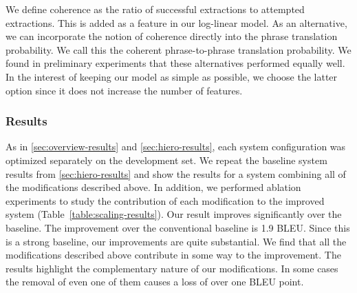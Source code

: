 We define coherence as the ratio of successful extractions 
to attempted extractions.  This is added as a feature in our
log-linear model.  As an alternative, we can incorporate the
notion of coherence directly into the phrase translation
probability.  We call this the coherent phrase-to-phrase
translation probability.  We found in preliminary experiments
that these alternatives performed equally well.  In the 
interest of keeping our model as simple as possible, we choose
the latter option since it does not increase the number of 
features.

\subsubsection{Results}\label{sec:scaling-results}

\figpreamble
\begin{table}
	\figpostamble
	\caption{Results of scaling modifications and ablation experiments.}
	\label{table:scaling-results}
\end{table}

As in \textsection\ref{sec:overview-results} and 
\textsection\ref{sec:hiero-results}, each system configuration
was optimized separately on the development set.
We repeat the baseline system results from \textsection\ref{sec:hiero-results}
and show the results for a system combining all of the modifications
described above.  In addition, we performed ablation experiments
to study the contribution of each modification to the improved
system (Table~\ref{table:scaling-results}).  
Our result improves significantly over the baseline.  The
improvement over the conventional baseline is 1.9 BLEU.  Since
this is a strong baseline, our improvements are
quite substantial.  We find that
all the modifications described above contribute in some way to the
improvement.  The results highlight the complementary nature of our 
modifications.  In some cases the removal of even one of them
causes a loss of over one BLEU point.

